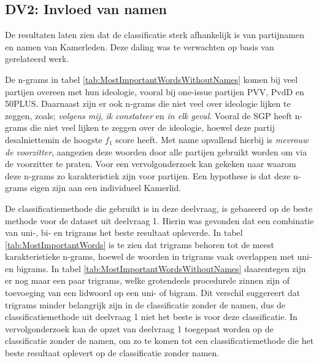 \subsection{DV2: Invloed van namen}
De resultaten laten zien dat de classificatie sterk afhankelijk is van partijnamen en namen van Kamerleden. Deze daling was te verwachten op basis van gerelateerd werk.\par
De n-grams in tabel \ref{tab:MostImportantWordsWithoutNames} komen bij veel partijen overeen met hun ideologie, vooral bij one-issue partijen PVV, PvdD en 50PLUS. Daarnaast zijn er ook n-grams die niet veel over ideologie lijken te zeggen, zoals; \textit{volgens mij}, \textit{ik constateer} en \textit{in elk geval}. Vooral de SGP heeft n-grams die niet veel lijken te zeggen over de ideologie, hoewel deze partij desalniettemin de hoogste $f_1$ score heeft. Met name opvallend hierbij is \textit{mevrouw de voorzitter}, aangezien deze woorden door alle partijen gebruikt worden om via de voorzitter te praten. Voor een vervolgonderzoek kan gekeken naar waarom deze n-grams zo karakteristiek zijn voor partijen. Een hypothese is dat deze n-grams eigen zijn aan een individueel Kamerlid.\par
De classificatiemethode die gebruikt is in deze deelvraag, is gebaseerd op de beste methode voor de dataset uit deelvraag 1. Hierin was gevonden dat een combinatie van uni-, bi- en trigrams het beste resultaat opleverde. In tabel \ref{tab:MostImportantWords} is te zien dat trigrams behoren tot de meest karakteristieke n-grams, hoewel de woorden in trigrams vaak overlappen met uni- en bigrams. In tabel \ref{tab:MostImportantWordsWithoutNames} daarentegen zijn er nog maar een paar trigrams, welke grotendeels procedurele zinnen zijn of toevoeging van een lidwoord op een uni- of bigram. Dit verschil suggereert dat trigrams minder belangrijk zijn in de classificatie zonder de namen, dus de classificatiemethode uit deelvraag 1 niet het beste is voor deze classificatie. In vervolgonderzoek kan de opzet van deelvraag 1 toegepast worden op de classificatie zonder de namen, om zo te komen tot een classificatiemethode die het beste resultaat oplevert op de classificatie zonder namen.\par 

